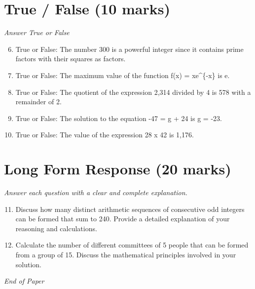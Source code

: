 \documentclass[12pt]{article}
\begin{document}
\section*{True / False (10 marks)}
\textit{Answer True or False}
\begin{enumerate}[label=\arabic*.]
\setcounter{enumi}{5}
\item True or False: The number 300 is a powerful integer since it contains prime factors with their squares as factors.
\item True or False: The maximum value of the function f(x) = xe^\{-x\} is e.
\item True or False: The quotient of the expression 2,314 divided by 4 is 578 with a remainder of 2.
\item True or False: The solution to the equation -47 = g + 24 is g = -23.
\item True or False: The value of the expression 28 x 42 is 1,176.
\end{enumerate}

\section*{Long Form Response (20 marks)}
\textit{Answer each question with a clear and complete explanation.}
\begin{enumerate}[label=\arabic*.]
\setcounter{enumi}{10}
\item Discuss how many distinct arithmetic sequences of consecutive odd integers can be formed that sum to 240. Provide a detailed explanation of your reasoning and calculations.
\item Calculate the number of different committees of 5 people that can be formed from a group of 15. Discuss the mathematical principles involved in your solution.
\end{enumerate}

\vfill
\noindent\textit{End of Paper}
\end{document}
